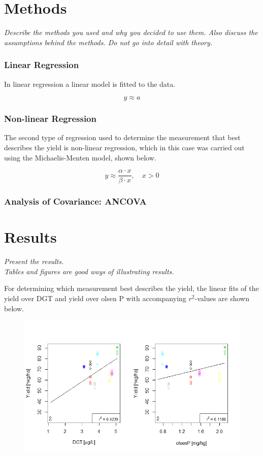 \documentclass[11pt, fleqn, titlepage]{article}
\begin{document}
\section{Methods}
\textit{Describe the methods you used and why you decided to use them. Also discuss the assumptions behind the methods. Do not go into detail with theory.}

\subsubsection*{Linear Regression}
In linear regression a linear model is fitted to the data. 

\[ y \approx a  \]

\subsubsection*{Non-linear Regression}
The second type of regression used to determine the measurement that best describes the yield is non-linear regression, which in this case was carried out using the Michaelis-Menten model, shown below.

\[y \approx \frac{\alpha \cdot x}{\beta \cdot x}, \quad x > 0 \]


\subsubsection*{Analysis of Covariance: ANCOVA}



\section{Results}
\textit{Present the results. \\ Tables and figures are good ways of illustrating results.}

For determining which measurement best describes the yield, the linear fits of the yield over DGT and yield over olsen P with accompanying $r^2$-values are shown below.

\begin{figure}[H]
	\centering
	\includegraphics[width=0.7\linewidth]{billeder/Linearfit.png}
	\caption{}
	\label{fig:linearfit}
\end{figure}
\end{document}
